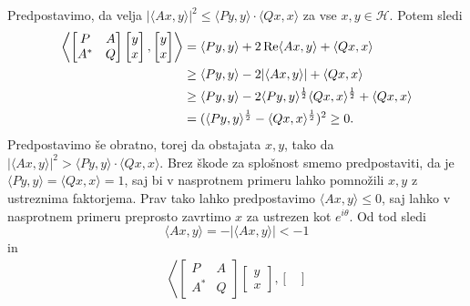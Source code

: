 \begin{dokaz}
    Predpostavimo, da velja $|\langle Ax, y\rangle|^2 \leq \langle Py, y\rangle \cdot \langle Qx, x \rangle$ za vse $x, y \in \mathcal{H}$.
        Potem sledi
        \begin{align*}
            \left\langle \begin{bmatrix}
                P & A\\
                 A^* & Q
            \end{bmatrix} \begin{bmatrix}
                y\\ x
            \end{bmatrix}, \begin{bmatrix}
                y \\ x
            \end{bmatrix} \right\rangle &= \langle Py, y \rangle + 2\operatorname{Re} \langle Ax, y \rangle + \langle Qx, x\rangle\\
            &\geq \langle Py, y \rangle - 2 |\langle Ax, y \rangle| + \langle Qx, x\rangle\\
            &\geq \langle Py, y \rangle - 2 \langle P y, y \rangle^{\frac{1}{2}} \langle Q x, x \rangle^{\frac{1}{2}}  + \langle Qx, x\rangle\\
            &= (\langle Py, y \rangle^{\frac{1}{2}} - \langle Qx, x \rangle^{\frac{1}{2}})^2 \geq 0.
        \end{align*}
        Predpostavimo še obratno, torej da obstajata $x, y$, tako da
        $|\langle Ax, y\rangle|^2 > \langle Py, y\rangle \cdot \langle Qx, x \rangle$.
        Brez škode za splošnost smemo predpostaviti, da je $\langle P y, y \rangle = \langle Qx, x \rangle = 1$, 
        saj bi v nasprotnem primeru lahko pomnožili $x, y$ z ustreznima faktorjema.
        Prav tako lahko predpostavimo $\langle Ax, y \rangle \leq 0$,
        saj lahko v nasprotnem primeru preprosto zavrtimo $x$ za ustrezen kot $e^{i \theta}$. 
        Od tod sledi $$\langle Ax, y \rangle = - |\langle Ax, y \rangle | < -1$$
        in 
        \begin{align*}
            \left\langle \begin{bmatrix}
                P & A\\
                 A^* & Q
            \end{bmatrix} \begin{bmatrix}
                y\\ x
            \end{bmatrix}, \begin{bmatrix}

\end{bmatrix}
\end{align*}
\end{dokaz}

